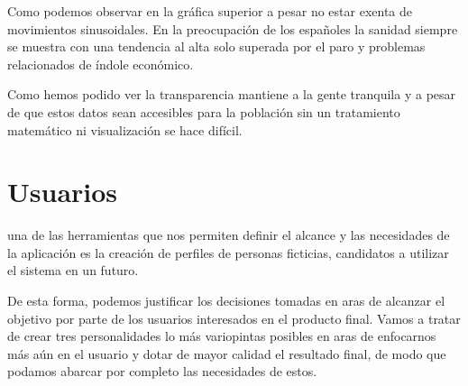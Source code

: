 Como podemos observar en la gráfica superior a pesar no estar exenta de movimientos sinusoidales.
En la preocupación de los españoles la sanidad siempre se muestra con una tendencia al alta
solo superada por el paro y problemas relacionados de índole económico.

Como hemos podido ver la transparencia mantiene a la gente tranquila y a pesar de que estos datos
sean accesibles para la población sin un tratamiento matemático ni visualización se hace difícil.

\section{Usuarios}
una de las herramientas que nos permiten definir el alcance y las necesidades de la aplicación es la creación de
perfiles de personas ficticias, candidatos a utilizar el sistema en un futuro.

De esta forma, podemos justificar los decisiones tomadas en aras de alcanzar el objetivo por parte de los usuarios
interesados en el producto final. Vamos a tratar de crear tres personalidades lo más variopintas posibles en aras
de enfocarnos más aún en el usuario y dotar de mayor calidad el resultado final, de modo que podamos abarcar por
completo las necesidades de estos.


